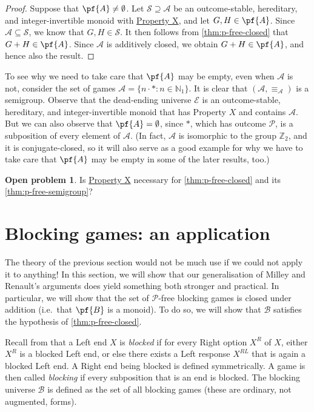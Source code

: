 \documentclass[11pt]{article}
\theoremstyle{definition}
\newtheorem{problem}[theorem]{Open problem}
\newcommand{\set}[1]{\mathcal{#1}}
\begin{document}
\begin{proof}
    Suppose that $\pf{A}\neq\emptyset$. Let $\set{S}\supseteq\set{A}$ be an
    outcome-stable, hereditary, and integer-invertible monoid with
    \hyperlink{prop:X}{Property X}, and let $G,H\in\pf{A}$. Since
    $\set{A}\subseteq\set{S}$, we know that $G,H\in\set{S}$. It then follows
    from \cref{thm:p-free-closed} that $G+H\in\pf{A}$. Since $\set{A}$ is
    additively closed, we obtain $G+H\in\pf{A}$, and hence also the result.
\end{proof}

To see why we need to take care that $\pf{A}$ may be empty, even when $\set{A}$
is not, consider the set of games $\set{A}=\{n\cdot*:n\in\mathbb{N}_1\}$. It is
clear that $(\set{A},\equiv_\set{A})$ is a semigroup. Observe that the
dead-ending universe $\set{E}$ is an outcome-stable, hereditary, and
integer-invertible monoid that has Property $X$ and contains $\set{A}$. But we
can also observe that $\pf{A}=\emptyset$, since $*$, which has outcome
$\mathscr{P}$, is a subposition of every element of $\set{A}$. (In fact,
$\set{A}$ is isomorphic to the group $\mathbb{Z}_2$, and it is
conjugate-closed, so it will also serve as a good example for why we have to
take care that $\pf{A}$ may be empty in some of the later results, too.)

\begin{problem}
    \label{open:X}
    Is \hyperlink{prop:X}{Property X} necessary for \cref{thm:p-free-closed}
    and its \cref{thm:p-free-semigroup}?
\end{problem}

\section{Blocking games: an application}
\label{sec:blocking}

The theory of the previous section would not be much use if we could not apply
it to anything! In this section, we will show that our generalisation of Milley
and Renault's arguments does yield something both stronger and practical. In
particular, we will show that the set of $\mathscr{P}$-free blocking games is
closed under addition (i.e.\ that $\pf{B}$ is a monoid). To do so, we will show
that $\set{B}$ satisfies the hypothesis of \cref{thm:p-free-closed}.

Recall from \cite{davies.mckay.ea:pocancellation} that a Left end $X$ is
\emph{blocked} if for every Right option $X^R$ of $X$, either $X^R$ is a
blocked Left end, or else there exists a Left response $X^{RL}$ that is again a
blocked Left end. A Right end being blocked is defined symmetrically. A game is
then called \emph{blocking} if every subposition that is an end is blocked. The
blocking universe $\set{B}$ is defined as the set of all blocking games (these
are ordinary, not augmented, forms).
\end{document}
